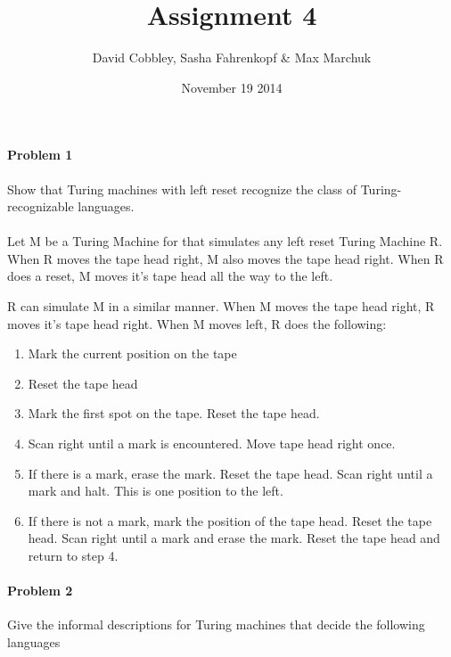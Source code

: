 ﻿\documentclass{article}
\title{Assignment 4}
\author{David Cobbley, Sasha Fahrenkopf \& Max Marchuk}
\date{November 19 2014}
\begin{document}
\maketitle


\paragraph{Problem 1} Show that Turing machines with left reset recognize
the class of Turing-recognizable languages.
\paragraph{} 
Let M be a Turing Machine for that simulates any left reset Turing Machine R. When  R moves the tape head right, M also moves the tape head right.  When R does a reset, M moves it's tape head all the way to the left.

R can simulate M in a similar manner. When M moves the tape head right, R moves it's tape head right. When M moves left, R does the following:
\begin{enumerate}[1.]

\item Mark the current position on the tape
\item Reset the tape head
\item Mark the first spot on the tape. Reset the tape head.
\item Scan right until a mark is encountered. Move tape head right once.
\item If there is a mark, erase the mark. Reset the tape head. Scan right until a mark and halt. This is one position to the left.
\item If there is not a mark, mark the position of the tape head. Reset the tape head. Scan right until a mark and erase the mark. Reset the tape head and return to step 4. 

\end {enumerate}


\paragraph{Problem 2} Give the informal descriptions for Turing machines that decide the following languages
\end{document}
